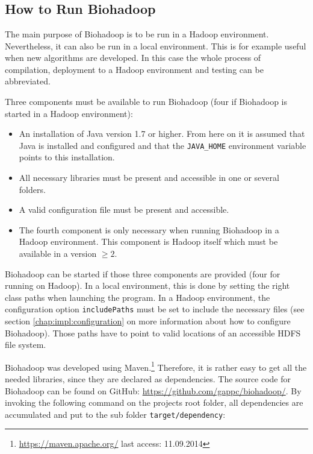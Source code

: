 \appendix
\addappheadtotoc

\chapter{}

\section{How to Run Biohadoop}
\label{chap:usage:run}
The main purpose of Biohadoop is to be run in a Hadoop environment. Nevertheless,  it can also be run in a local environment. This is for example useful when new algorithms are developed. In this case the whole process of compilation, deployment to a Hadoop environment and testing can be abbreviated.

Three components must be available to run Biohadoop (four if Biohadoop is started in a Hadoop environment):

\begin{itemize}
  \item An installation of Java version 1.7 or higher. From here on it is assumed that Java is installed and configured and that the \texttt{JAVA\_HOME} environment variable points to this installation.
  \item All necessary libraries must be present and accessible in one or several folders.
  \item A valid configuration file must be present and accessible.
  \item The fourth component is only necessary when running Biohadoop in a Hadoop environment. This component is Hadoop itself which must be available in a version $\geq 2$.
\end{itemize}

Biohadoop can be started if those three components are provided (four for running on Hadoop). In a local environment, this is done by setting the right class paths when launching the program. In a Hadoop environment, the configuration option \texttt{includePaths} must be set to include the necessary files (see section \ref{chap:impl:configuration} on more information about how to configure Biohadoop). Those paths have to point to valid locations of an accessible HDFS file system.

Biohadoop was developed using Maven.\footnote{\url{https://maven.apache.org/} last access: 11.09.2014} Therefore, it is rather easy to get all the needed libraries, since they are declared as dependencies. The source code for Biohadoop can be found on GitHub: \url{https://github.com/gappc/biohadoop/}. By invoking the following command on the projects root folder, all dependencies are accumulated and put to the sub folder \texttt{target/dependency}:

